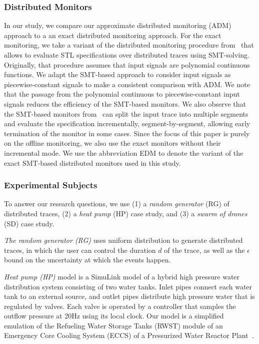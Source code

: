 \subsubsection{Distributed Monitors} \label{sec:testGeneration}
In our study, we compare our approximate distributed monitoring (ADM) approach to a an exact distributed monitoring approach.
For the exact monitoring, we take a variant of the distributed monitoring procedure from~\cite{MomtazAB23} that allows to evaluate STL specifications over distributed traces using SMT-solving.
Originally, that procedure assumes that input signals are polynomial continuous functions.
We adapt the SMT-based approach to consider input signals as piecewise-constant signals to make a consistent comparison with ADM.
We note that the passage from the polynomial continuous to piecewise-constant input signals reduces the efficiency of the SMT-based monitors.
We also observe that the SMT-based monitors from~\cite{MomtazAB23} can split the input trace into multiple segments and evaluate the specification incrementally, segment-by-segment, allowing early termination of the monitor in some cases.
Since the focus of this paper is purely on the offline monitoring, we also use the exact monitors without their incremental mode.
We use the abbreviation EDM to denote the variant of the exact SMT-based distributed monitors used in this study.


\subsubsection{Experimental Subjects}
To answer our research questions, we use (1) a \emph{random generator} (RG) of distributed traces, (2) a \emph{heat pump} (HP) case study, and (3) a \emph{swarm of drones} (SD) case study.  

\noindent \emph{The random generator (RG)} uses uniform distribution to generate distributed traces, in which the user can control the duration $d$ of the trace, as well as the $\epsilon$ bound on the uncertainty at which the events happen.

\noindent \emph{Heat pump (HP)} model is a SimuLink model of a hybrid high pressure water distribution system consisting of two water tanks. Inlet pipes connect each water tank to an external source, and outlet pipes distribute high pressure water that is regulated by valves.
Each valve is operated by a controller that samples the outflow pressure at 20Hz using its local clock. Our model is a simplified emulation of the Refueling Water Storage Tanks (RWST) module of an Emergency Core Cooling System (ECCS) of a Pressurized Water Reactor Plant~\cite{USNRCPWR}.

